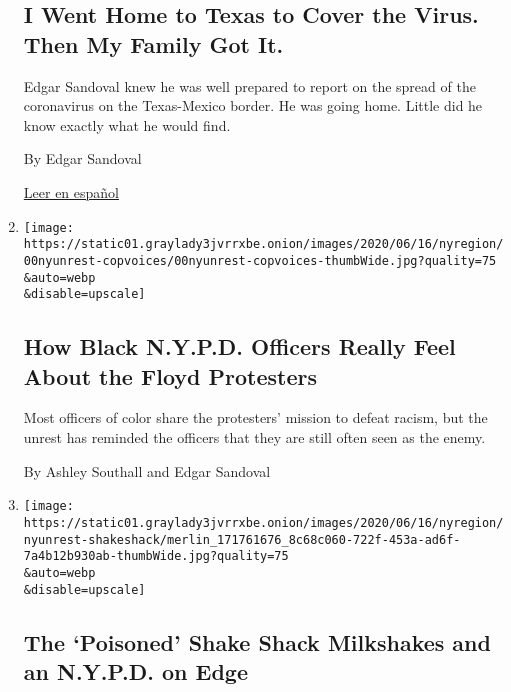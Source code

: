 \begin{enumerate}
{  \subsection{I Went Home to Texas to Cover the Virus. Then My Family
  Got
  It.}\label{i-went-home-to-texas-to-cover-the-virus-then-my-family-got-it}}

  Edgar Sandoval knew he was well prepared to report on the spread of
  the coronavirus on the Texas-Mexico border. He was going home. Little
  did he know exactly what he would find.

  By Edgar Sandoval

  \href{https://www.nytimes3xbfgragh.onion/es/2020/07/14/espanol/texas-coronavirus-rio-grande-valley.html}{Leer
  en español}
\item
  \href{/2020/06/17/nyregion/black-hispanic-officers-nypd-protests.html}{}

  \texttt{[image: https://static01.graylady3jvrrxbe.onion/images/2020/06/16/nyregion/00nyunrest-copvoices/00nyunrest-copvoices-thumbWide.jpg?quality=75\\\&auto=webp\\\&disable=upscale]}

  \hypertarget{how-black-nypd-officers-really-feel-about-the-floyd-protesters}{%
  \subsection{How Black N.Y.P.D. Officers Really Feel About the Floyd
  Protesters}\label{how-black-nypd-officers-really-feel-about-the-floyd-protesters}}

  Most officers of color share the protesters' mission to defeat racism,
  but the unrest has reminded the officers that they are still often
  seen as the enemy.

  By Ashley Southall and Edgar Sandoval
\item
  \href{/2020/06/16/nyregion/shake-shack-police-nypd.html}{}

  \texttt{[image: https://static01.graylady3jvrrxbe.onion/images/2020/06/16/nyregion/nyunrest-shakeshack/merlin\_171761676\_8c68c060-722f-453a-ad6f-7a4b12b930ab-thumbWide.jpg?quality=75\\\&auto=webp\\\&disable=upscale]}

  \hypertarget{the-poisoned-shake-shack-milkshakes-and-an-nypd-on-edge}{%
  \subsection{The `Poisoned' Shake Shack Milkshakes and an N.Y.P.D. on
  Edge}\label{the-poisoned-shake-shack-milkshakes-and-an-nypd-on-edge}}


\end{enumerate}
